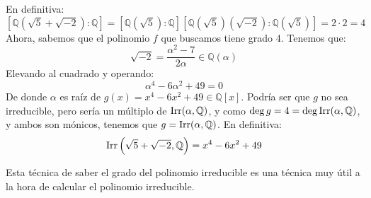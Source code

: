 \begin{ejemplo}
    En definitiva:
    \begin{equation*}
        \left[\mathbb{Q}(\sqrt{5}+\sqrt{-2}):\mathbb{Q}\right] = \left[\mathbb{Q}\left(\sqrt{5}\right):\mathbb{Q}\right] \left[\mathbb{Q}\left(\sqrt{5}\right)\left(\sqrt{-2}\right):\mathbb{Q}\left(\sqrt{5}\right)\right] = 2\cdot 2 =  4
    \end{equation*}
    Ahora, sabemos que el polinomio $f$ que buscamos tiene grado 4. Tenemos que:
    \begin{equation*}
        \sqrt{-2} = \dfrac{\alpha^2-7}{2\alpha} \in  \mathbb{Q}(\alpha)
    \end{equation*}
    Elevando al cuadrado y operando:
    \begin{equation*}
        \alpha^4 - 6\alpha^2 + 49 = 0
    \end{equation*}
    De donde $\alpha$ es raíz de $g(x) = x^4-6x^2+49\in \mathbb{Q}[x]$. Podría ser que $g$ no sea irreducible, pero sería un múltiplo de $\operatorname{Irr}(\alpha,\mathbb{Q})$, y como $\deg g = 4 = \deg \operatorname{Irr}(\alpha,\mathbb{Q})$, y ambos son mónicos, tenemos que $g = \operatorname{Irr}(\alpha,\mathbb{Q})$. En definitiva:
    \begin{equation*}
        \operatorname{Irr}\left(\sqrt{5}+\sqrt{-2}, \mathbb{Q}\right) = x^4-6x^2+49
    \end{equation*}
\end{ejemplo}

Esta técnica de saber el grado del polinomio irreducible es una técnica muy útil a la hora de calcular el polinomio irreducible.\\


